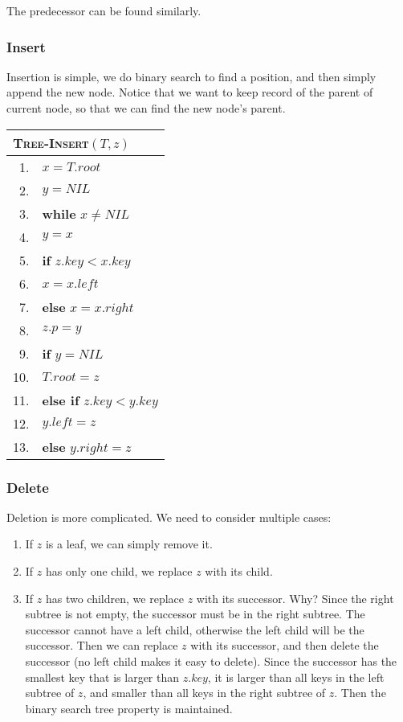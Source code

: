 \documentclass[a4paper,12pt]{article}
\begin{document}
The predecessor can be found similarly.

\subsubsection{Insert}

Insertion is simple, we do binary search to find a position, and then simply append the new node.
Notice that we want to keep record of the parent of current node, so that we can find the new node's parent.

\begin{center}
	\begin{tabular}{rl}
		\toprule
		\multicolumn{2}{l}{\textsc{Tree-Insert}$(T, z)$} \\
		\midrule
		1. & $x = T.root$ \\
		2. & $y = NIL$ \\
		3. & \textbf{while} $x \neq NIL$ \\
		4. & \quad $y = x$ \\
		5. & \quad \textbf{if} $z.key < x.key$ \\
		6. & \quad \quad $x = x.left$ \\
		7. & \quad \textbf{else} $x = x.right$ \\
		8. & $z.p = y$ \\
		9. & \textbf{if} $y = NIL$ \\
		10. & \quad $T.root = z$ \\
		11. & \textbf{else if} $z.key < y.key$ \\
		12. & \quad $y.left = z$ \\
		13. & \textbf{else} $y.right = z$ \\
		\bottomrule
	\end{tabular}
\end{center}

\subsubsection{Delete}

Deletion is more complicated.
We need to consider multiple cases:
\begin{enumerate}
	\item If $z$ is a leaf, we can simply remove it.
	\item If $z$ has only one child, we replace $z$ with its child.
	\item If $z$ has two children, we replace $z$ with its successor. 
	Why? Since the right subtree is not empty, the successor must be in the right subtree.
	The successor cannot have a left child, otherwise the left child will be the successor.
	Then we can replace $z$ with its successor, and then delete the successor (no left child makes it easy to delete).
	Since the successor has the smallest key that is larger than $z.key$, it is larger than all keys in the left subtree of $z$, and smaller than all keys in the right subtree of $z$.
	Then the binary search tree property is maintained.
\end{enumerate}
\end{document}
